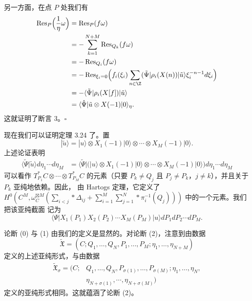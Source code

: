 另一方面，在点 $P$ 处我们有
\[
  \begin{aligned}
  \operatorname{Res}_P\Bigl(\frac{1}{\eta}\omega\Bigr)
  &= \operatorname{Res}_P(f\omega)\\
  &= -\sum_{k=1}^{N+M}\operatorname{Res}_{Q_k}(f\omega)\\
  &= -\operatorname{Res}_{Q_i}(f\omega)\\
  &= -\operatorname{Res}_{\xi_i=0}\Bigl(f_i(\xi_i)\sum_{n\in\Z}
     (\tilde{\Psi}|\rho_i(X(n))|\tilde{u}\rangle\xi_i^{-n-1}d\xi_i\Bigr)\\
  &= -\langle\tilde{\Psi}|\rho_i(X[f])|\tilde{u}\rangle\\
  &= \langle\hat{\Psi}|\tilde{u}\otimes X(-1)|0\rangle_\eta .
  \end{aligned}
\]
这就证明了断言 3。\hfill$\square$

现在我们可以证明定理 3.24 了。置
\[
  |\tilde{u}\rangle = |u\rangle\otimes X_1(-1)|0\rangle\otimes\cdots
  \otimes X_M(-1)|0\rangle .
\]
上述论证表明
\[
  \begin{aligned}
  \langle\tilde{\Psi}|\tilde{u}\rangle d\eta_1\cdots d\eta_M
  &= \langle\tilde{\Psi}|\bigl(|u\rangle\otimes X_1(-1)|0\rangle\otimes\cdots
     \otimes X_M(-1)|0\rangle\bigr) d\eta_1\cdots d\eta_M
  \end{aligned}
\]
可以看作 $T_{P_1}^*C\otimes\cdots\otimes T_{P_M}^*C$ 的元素（只要
$P_k\ne Q_j$ 且 $P_j\ne P_k$，$j\ne k$），并且关于 $P_k$ 亚纯地依赖。因此，
由 Hartogs 定理，它定义了
$H^0(C^M,\omega_C^{\boxtimes M}(\sum_{i<j}*\Delta_{ij}
+\sum_{i=1}^{M}\sum_{j=1}^{N}*\pi_i^{-1}(Q_j)))$ 中的一个元素。我们把该亚纯截面
记为
\[
  \langle\Psi|X_1(P_1)X_2(P_2)\cdots X_M(P_M)|u\rangle
  dP_1dP_2\cdots dP_M .
\]

论断 (0) 与 (1) 由我们的定义是显然的。对论断 (2)，注意到由数据
\[
  \tilde{\mathfrak{X}} = (C;Q_1,\dots,Q_N,P_1,\dots,P_M;
  \eta_1,\dots,\eta_{N+M})
\]
定义的上述亚纯形式，与由数据
\[
  \begin{aligned}
  \tilde{\mathfrak{X}}_\sigma = (C;&Q_1,\dots,Q_N,P_{\sigma(1)},\dots,
  P_{\sigma(M)};\eta_1,\dots,\eta_N,\\
  &\eta_{N+\sigma(1)},\cdots,\eta_{N+\sigma(M)})
  \end{aligned}
\]
定义的亚纯形式相同。这就蕴涵了论断 (2)。

